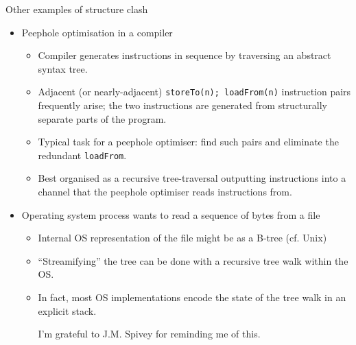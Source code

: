 \documentclass{concdistfoils}
\def\subheading#1{\begin{cframed}[8.8in]{#1}\end{cframed}}
\begin{document}
\begin{slide}
\begin{itemize}
\begin{comment}
case class a(l: String) extends Tree[String] 
{ def label    = l
  def subTrees = List()
  def apply(subtrees: Tree[String]*) = new Tree[String] 
  { def label = l
    def subTrees = subtrees
  }
}

object testtreeorder
{
  def main(args: Array[String]) =
  { val t1 = a("1")(a("2"), a("3"), a("4"))
    val t2 = a("1")(a("2")(a("3")))
    for (arg <- List(t1, t2))
    { val mid = OneOne[String]
      (proc { flatten(arg, mid); mid!"---"; mid.close } || console(mid))()     
    }
    printf("%
  }
}
\end{obj}
\end{note}
\end{comment}
\end{itemize}
\end{slide}

\begin{slide}
\subheading{Other examples of structure clash}
\vfill
\begin{itemize}
\item Peephole optimisation in a compiler
\begin{itemize}
\item Compiler generates instructions in sequence by traversing an abstract
      syntax tree.
\item Adjacent (or nearly-adjacent) \texttt{storeTo(n); loadFrom(n)} 
      instruction pairs frequently arise; the two
      instructions are generated from structurally separate parts of the
      program.
\item Typical task for a peephole optimiser: find such pairs and 
      eliminate the redundant \texttt{loadFrom}.
\item Best organised as a recursive tree-traversal outputting instructions
      into a channel that the peephole optimiser reads
      instructions from.
\end{itemize}

\item Operating system process wants to read a sequence of bytes from a file
\begin{itemize}
\item Internal OS representation of the file might be as a B-tree (cf. Unix)
\item ``Streamifying'' the tree can be done with a recursive tree walk within the OS.
\item In fact, most OS implementations encode the state of the tree walk in an
      explicit stack.
\begin{note}
I'm grateful to J.M. Spivey for reminding me of this.
\end{note}

\end{itemize}
\end{itemize}
\end{slide}
\end{document}
